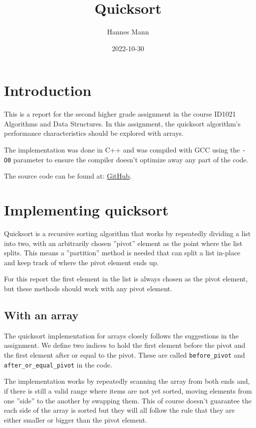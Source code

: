 \documentclass[a4paper,11pt]{article}
\begin{document}
\title{
    \textbf{Quicksort}
}
\author{Hannes Mann}
\date{2022-10-30}

\maketitle

\section*{Introduction}

This is a report for the second higher grade assignment in the course ID1021 Algorithms and Data Structures.
In this assignment, the quicksort algorithm's performance characteristics should be explored with arrays.

The implementation was done in C++ and was compiled with GCC using the {\tt -O0} parameter to ensure the compiler doesn't optimize away any part of the code.

The source code can be found at: \href{https://github.com/hannesmann/ID1021/tree/ce3ccd74515c135930f907e790a124e761d84be9/src/quicksort}{GitHub}.

\section*{Implementing quicksort}

Quicksort is a recursive sorting algorithm that works by repeatedly dividing a list into two, with an arbitrarily chosen ''pivot'' element as the point where the list splits.
This means a ''partition'' method is needed that can split a list in-place and keep track of where the pivot element ends up.

For this report the first element in the list is always chosen as the pivot element, but these methods should work with any pivot element.

\subsection*{With an array}

The quicksort implementation for arrays closely follows the suggestions in the assignment.
We define two indices to hold the first element before the pivot and the first element after or equal to the pivot.
These are called \texttt{before_pivot} and \texttt{after_or_equal_pivot} in the code.

The implementation works by repeatedly scanning the array from both ends and, if there is still a valid range where items are not yet sorted, moving elements from one ''side'' to the another by swapping them.
This of course doesn't guarantee the each side of the array is sorted but they will all follow the rule that they are either smaller or bigger than the pivot element.
\end{document}
